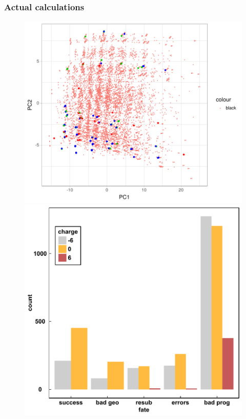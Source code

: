 \documentclass[xcolor=dvipsnames]{beamer}
\begin{document}
%

\begin{frame}
\frametitle{Actual calculations}
\begin{figure}[ht] 
	\label{ fig7} 
	\begin{minipage}[b]{0.5\linewidth}
		\centering
		\includegraphics[width=.6\linewidth]{img/pcaWithCalcs.pdf} 
	\end{minipage}%
	\begin{minipage}[b]{0.5\linewidth}
		\centering
		\includegraphics[width=.6\linewidth]{img/fateByCharge.pdf} 
	\end{minipage} 
	\begin{minipage}[b]{0.5\linewidth}
		\centering

\end{minipage}
\end{figure}
\end{frame}
\end{document}
